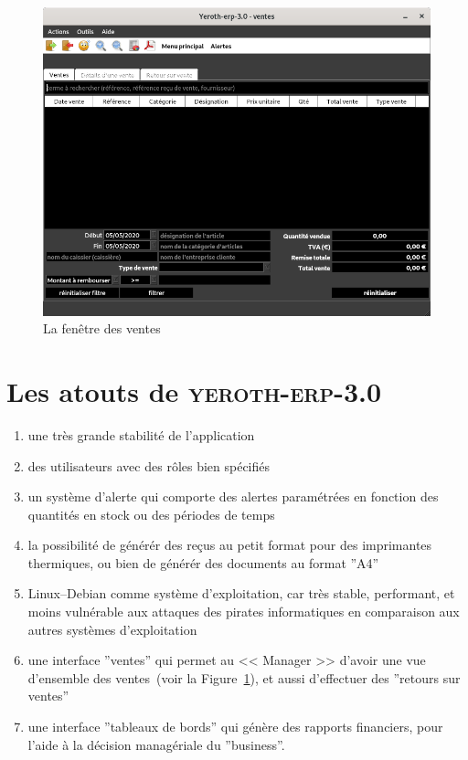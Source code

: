 \documentclass[a4paper, 10pt, twocolumn]{article}
\newcommand{\yeren}{\textsc{yeroth-erp-3.0}\xspace}
\newcommand{\manager}{<< Manager >>\xspace}
\begin{document}
\begin{figure}[!htbp]
\centering
\includegraphics[scale=0.32]{../images/yeren-fenetre-caisse.png}
\caption{La fen\^etre des ventes}
\label{fig:fenetre-de-la-vente}
\end{figure}

\vspace{-1.9em}
\section{Les atouts de \yeren}
\vspace{-0.3em}
\begin{enumerate}[1)]
	\itemsep -0.3em
	\item une tr\`es grande stabilit\'e de l'application
	\item des utilisateurs avec des r\^oles bien sp\'ecifi\'es
	\item un syst\`eme d'alerte qui comporte des alertes
	      param\'etr\'ees en fonction des quantit\'es en stock
	      ou des p\'eriodes de temps
	\item la possibilit\'e de g\'en\'er\'er des re\c{c}us au
	      petit format pour des imprimantes thermiques, ou bien
	      de g\'en\'er\'er des documents au format ''A4''
	\item Linux--Debian comme syst\`eme d'exploitation, car
	      tr\`es stable, performant, et moins vuln\'erable
	      aux attaques des pirates informatiques en comparaison
	      aux autres syst\`emes d'exploitation
	\item une interface ''ventes'' qui permet au \manager
	      d'avoir une vue d'ensemble des 
	      ventes~(voir la Figure~\ref{fig:fenetre-de-la-vente}),
	      et aussi d'effectuer des ''retours sur ventes''
	\item une interface ''tableaux de bords'' qui
		  g\'en\`ere des rapports financiers,
		  pour l'aide \`a la d\'ecision manag\'eriale
		  du ''business''.
\end{enumerate}
\end{document}

